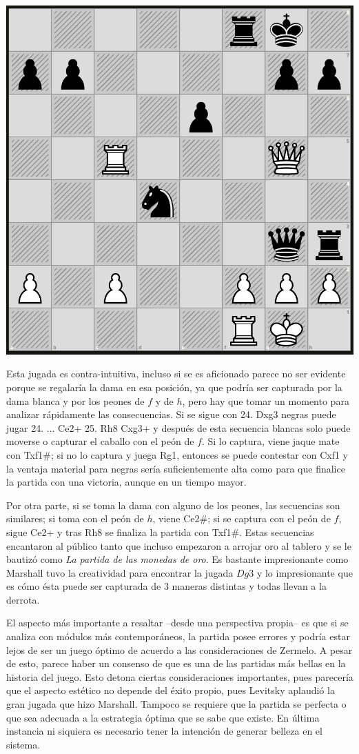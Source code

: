 \documentclass[twoside,openright,12pt,a4paper,spanish]{book}
\begin{document}
\begin{center}
    \includegraphics[width=8.0 cm,height=8.0 cm]{marshall-levitsky23-2.png}
\end{center}

Esta jugada es contra-intuitiva, incluso si se es aficionado parece no ser evidente porque se regalar\'ia la dama en esa posici\'on, ya que podría ser capturada por la dama blanca y por los peones de $f$ y de $h$, pero hay que tomar un momento para analizar rápidamente las consecuencias. Si se sigue con 24. Dxg3 negras puede jugar 24. ... Ce2+ 25. Rh8 Cxg3+ y despu\'es de esta secuencia blancas solo puede moverse o capturar el caballo con el pe\'on de $f$. Si lo captura, viene jaque mate con Txf1\#; si no lo captura y juega Rg1, entonces se puede contestar con Cxf1 y la ventaja material para negras ser\'ia suficientemente alta como para que finalice la partida con una victoria, aunque en un tiempo mayor. 

Por otra parte, si se toma la dama con alguno de los peones, las secuencias son similares; si toma con el pe\'on de $h$, viene Ce2\#; si se captura con el pe\'on de $f$, sigue Ce2+ y tras Rh8 se finaliza la partida con Txf1\#. Estas secuencias encantaron al p\'ublico tanto que incluso empezaron a arrojar oro al tablero \cite[p. 138]{marshall2002my} y se le bautiz\'o como \emph{La partida de las monedas de oro}. Es bastante impresionante como Marshall tuvo la creatividad para encontrar la jugada $Dg3$ y lo impresionante que es cómo ésta puede ser capturada de 3 maneras distintas y todas llevan a la derrota.

El aspecto más importante a resaltar --desde una perspectiva propia-- es que si se analiza con módulos más contemporáneos, la partida posee errores y podría estar lejos de ser un juego óptimo de acuerdo a las consideraciones de Zermelo. A pesar de esto, parece haber un consenso de que es una de las partidas más bellas en la historia del juego. Esto detona ciertas consideraciones importantes, pues parecería que el aspecto estético no depende del éxito propio, pues Levitsky aplaudió la gran jugada que hizo Marshall. Tampoco se requiere que la partida se perfecta o que sea adecuada a la estrategia óptima que se sabe que existe. En última instancia ni siquiera es necesario tener la intención de generar belleza en el sistema.
\end{document}

